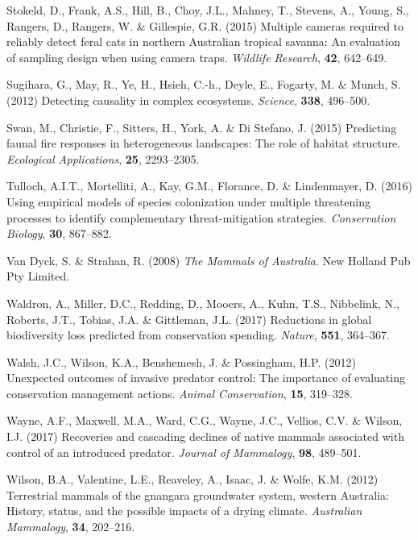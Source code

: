 \documentclass[]{elsarticle} %
\begin{document}
\leavevmode\hypertarget{ref-stokeld2015multiple}{}%
Stokeld, D., Frank, A.S., Hill, B., Choy, J.L., Mahney, T., Stevens, A., Young, S., Rangers, D., Rangers, W. \& Gillespie, G.R. (2015) Multiple cameras required to reliably detect feral cats in northern Australian tropical savanna: An evaluation of sampling design when using camera traps. \emph{Wildlife Research}, \textbf{42}, 642--649.

\leavevmode\hypertarget{ref-sugihara2012detecting}{}%
Sugihara, G., May, R., Ye, H., Hsieh, C.-h., Deyle, E., Fogarty, M. \& Munch, S. (2012) Detecting causality in complex ecosystems. \emph{Science}, \textbf{338}, 496--500.

\leavevmode\hypertarget{ref-swan2015predicting}{}%
Swan, M., Christie, F., Sitters, H., York, A. \& Di Stefano, J. (2015) Predicting faunal fire responses in heterogeneous landscapes: The role of habitat structure. \emph{Ecological Applications}, \textbf{25}, 2293--2305.

\leavevmode\hypertarget{ref-tulloch2016using}{}%
Tulloch, A.I.T., Mortelliti, A., Kay, G.M., Florance, D. \& Lindenmayer, D. (2016) Using empirical models of species colonization under multiple threatening processes to identify complementary threat-mitigation strategies. \emph{Conservation Biology}, \textbf{30}, 867--882.

\leavevmode\hypertarget{ref-van2008mammals}{}%
Van Dyck, S. \& Strahan, R. (2008) \emph{The Mammals of Australia}. New Holland Pub Pty Limited.

\leavevmode\hypertarget{ref-waldron2017reductions}{}%
Waldron, A., Miller, D.C., Redding, D., Mooers, A., Kuhn, T.S., Nibbelink, N., Roberts, J.T., Tobias, J.A. \& Gittleman, J.L. (2017) Reductions in global biodiversity loss predicted from conservation spending. \emph{Nature}, \textbf{551}, 364--367.

\leavevmode\hypertarget{ref-walsh2012unexpected}{}%
Walsh, J.C., Wilson, K.A., Benshemesh, J. \& Possingham, H.P. (2012) Unexpected outcomes of invasive predator control: The importance of evaluating conservation management actions. \emph{Animal Conservation}, \textbf{15}, 319--328.

\leavevmode\hypertarget{ref-wayne2017recoveries}{}%
Wayne, A.F., Maxwell, M.A., Ward, C.G., Wayne, J.C., Vellios, C.V. \& Wilson, I.J. (2017) Recoveries and cascading declines of native mammals associated with control of an introduced predator. \emph{Journal of Mammalogy}, \textbf{98}, 489--501.

\leavevmode\hypertarget{ref-wilson2012terrestrial}{}%
Wilson, B.A., Valentine, L.E., Reaveley, A., Isaac, J. \& Wolfe, K.M. (2012) Terrestrial mammals of the gnangara groundwater system, western Australia: History, status, and the possible impacts of a drying climate. \emph{Australian Mammalogy}, \textbf{34}, 202--216.
\end{document}
